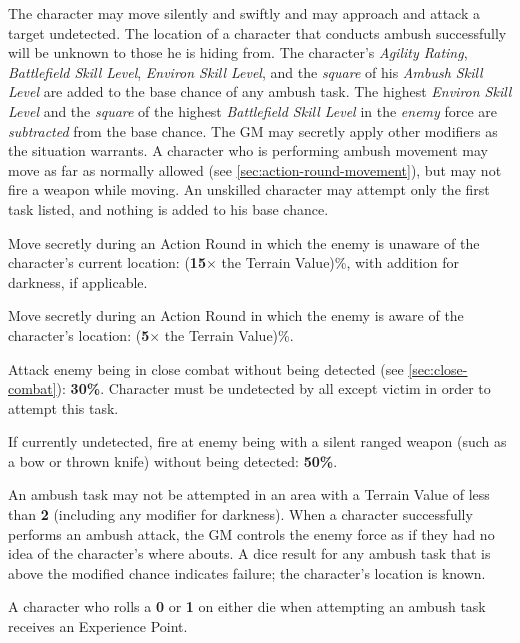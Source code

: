 \label{sec:skill-ambush}

The character may move silently and swiftly and may approach and
attack a target undetected.  The location of a character that conducts
ambush successfully will be unknown to those he is hiding from.  The
character's \emph{Agility Rating}, \emph{Battlefield Skill Level},
\emph{Environ Skill Level}, and the \emph{square} of his \emph{Ambush
  Skill Level} are added to the base chance of any ambush task.  The
highest \emph{Environ Skill Level} and the \emph{square} of the
highest \emph{Battlefield Skill Level} in the \emph{enemy} force
are \emph{subtracted} from the base chance.  The GM may secretly apply
other modifiers as the situation warrants.  A character who is
performing ambush movement may move as far as normally allowed (see
\ref{sec:action-round-movement}), but may not fire a weapon while
moving.  An unskilled character may attempt only the first task listed,
and nothing is added to his base chance.

\begin{tasklist}
\item Move secretly during an Action Round in which the enemy is
  unaware of the character's current location: (\textbf{15$\times$}
  the Terrain Value)\%, with addition for darkness, if applicable.
\item Move secretly during an Action Round in which the enemy is aware
  of the character's location: (\textbf{5$\times$} the Terrain
  Value)\%.
\item Attack enemy being in close combat without being detected (see
  \ref{sec:close-combat}): \textbf{30\%}.  Character must be
  undetected by all except victim in order to attempt this task.
\item If currently undetected, fire at enemy being with a silent
  ranged weapon (such as a bow or thrown knife) without being
  detected: \textbf{50\%}.
\end{tasklist}

An ambush task may not be attempted in an area with a Terrain Value of
less than \textbf{2} (including any modifier for darkness).  When a
character successfully performs an ambush attack, the GM controls the
enemy force as if they had no idea of the character's where abouts.  A
dice result for any ambush task that is above the modified chance
indicates failure; the character's location is known.

A character who rolls a \textbf{0} or \textbf{1} on either die when
attempting an ambush task receives an Experience Point.



